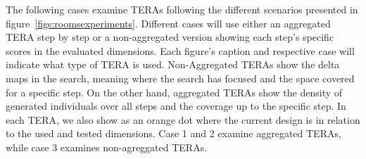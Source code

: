 

The following cases examine TERAs following the different scenarios presented in figure~\ref{figs:roomsexperiments}. Different cases will use either an aggregated TERA step by step or a non-aggregated version showing each step's specific scores in the evaluated dimensions. Each figure's caption and respective case will indicate what type of TERA is used. Non-Aggregated TERAs show the delta maps in the search, meaning where the search has focused and the space covered for a specific step. On the other hand, aggregated TERAs show the density of generated individuals over all steps and the coverage up to the specific step. In each TERA, we also show as an orange dot where the current design is in relation to the used and tested dimensions. Case 1 and 2 examine aggregated TERAs, while case 3 examines non-agreggated TERAs.


